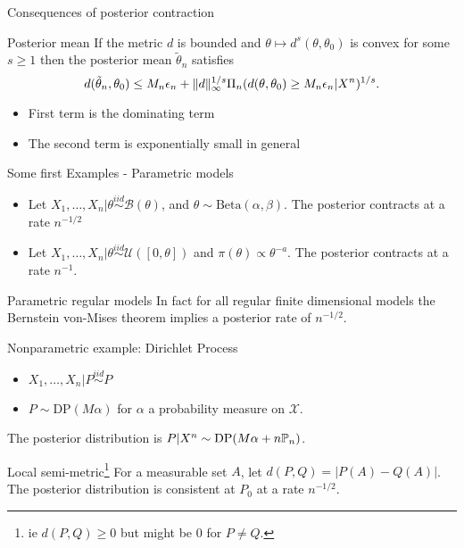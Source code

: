 {Consequences of posterior contraction}

\begin{block}{Posterior mean}
If the metric $d$ is bounded and $\theta \mapsto d^s(\theta, \theta_0)$ is convex for some $s \geq 1$ then the posterior mean $\tilde{\theta}_n$ satisfies 
$$
d(\tilde{\theta}_n,\theta_0) \leq M_n\epsilon_n + \Vert d \Vert_\infty^{1/s} \Pi_n(d(\theta,\theta_0) \geq M_n \epsilon_n|X^n)^{1/s}.
$$
\end{block}
 
\begin{itemize}
\item First term is the dominating term
\item The second term is exponentially small in general
\end{itemize}






{Some first Examples - Parametric models}

\begin{itemize}
\item Let $X_1, \dots, X_n |\theta \overset{iid}{\sim} \mathcal{B}(\theta) $, and $\theta\sim \text{Beta}(\alpha,\beta)$. The posterior contracts at a rate $n^{-1/2}$
\item Let $X_1,\dots, X_n|\theta \overset{iid}{\sim} \mathcal{U}([0,\theta])$ and $\pi(\theta) \propto \theta^{-a}$. The posterior contracts at a rate $n^{-1}$.
\end{itemize}
 
\begin{block}{Parametric regular models}
In fact for all regular finite dimensional models the \alert{Bernstein von-Mises} theorem implies a posterior rate of $n^{-1/2}$. 
\end{block}






{Nonparametric example: Dirichlet Process}

\begin{itemize}
\item $X_1, \dots, X_n | P \overset{iid}{\sim} P $ 
\item $P\sim \text{DP}(M\alpha)$ for $\alpha$ a probability measure on $\mathcal{X}$. 
\end{itemize}

The posterior distribution is $P|X^n \sim \text{DP}(M\alpha + n\mathbb{P}_n)$. 
 
\begin{block}{Local semi-metric\footnote{ie $d(P,Q) \geq 0$ but might be 0 for $P\neq Q$.}}
For a measurable set $A$, let $d(P,Q) = |P(A) - Q(A)|$. The posterior distribution is consistent at $P_0$ at a rate $n^{-1/2}$.  
\end{block}
 

